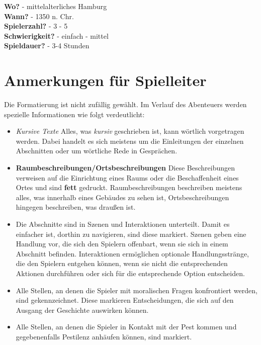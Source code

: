 
\textbf{Wo?}            -  mittelalterliches Hamburg \\
\textbf{Wann?}          -  1350 n. Chr. \\
\textbf{Spielerzahl?}   -  3 - 5 \\
\textbf{Schwierigkeit?} -  einfach - mittel \\
\textbf{Spieldauer?}    -  3-4 Stunden

\section{Anmerkungen für Spielleiter}

Die Formatierung ist nicht zufällig gewählt. Im Verlauf des Abenteuers werden spezielle Informationen wie folgt verdeutlicht:

\begin{itemize}
  \item \textit{Kursive Texte}
  Alles, was \textit{kursiv} geschrieben ist, kann wörtlich vorgetragen werden. Dabei handelt es sich meistens um die Einleitungen der einzelnen Abschnitten oder um wörtliche Rede in Gesprächen.

  \item \textbf{Raumbeschreibungen/Ortsbeschreibungen}
  Diese Beschreibungen verweisen auf die Einrichtung eines Raums oder die Beschaffenheit eines Ortes und sind \textbf{fett} gedruckt. Raumbeschreibungen beschreiben meistens alles, was innerhalb eines Gebäudes zu sehen ist, Ortsbeschreibungen hingegen beschreiben, was draußen ist.

  \item {}
  Die Abschnitte sind in Szenen und Interaktionen unterteilt. Damit es einfacher ist, dorthin zu navigieren, sind diese  markiert. Szenen geben eine Handlung vor, die sich den Spielern offenbart, wenn sie sich in einem Abschnitt befinden. Interaktionen ermöglichen optionale Handlungsstränge, die den Spielern entgehen können, wenn sie nicht die entsprechenden Aktionen durchführen oder sich für die entsprechende Option entscheiden.

  \item {}
  Alle Stellen, an denen die Spieler mit moralischen Fragen konfrontiert werden, sind  gekennzeichnet. Diese markieren Entscheidungen, die sich auf den Ausgang der Geschichte auswirken können.

  \item {}
  Alle Stellen, an denen die Spieler in Kontakt mit der Pest kommen und gegebenenfalls Pestilenz anhäufen können, sind  markiert.
\end{itemize}
